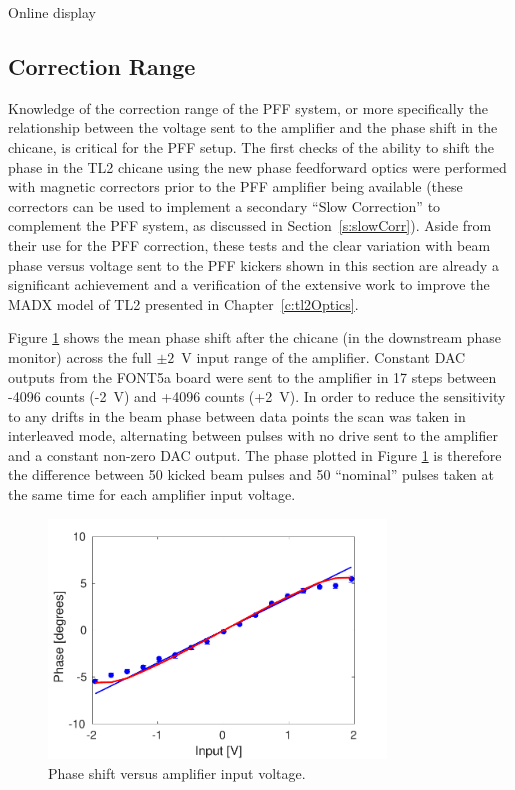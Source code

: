 Online display



\subsection{Correction Range}
\label{ss:corrRange}

Knowledge of the correction range of the PFF system, or more specifically the relationship between the voltage sent to the amplifier and the phase shift in the chicane, is critical for the PFF setup. The first checks of the ability to shift the phase in the TL2 chicane using the new phase feedforward optics were performed with magnetic correctors prior to the PFF amplifier being available (these correctors can be used to implement a secondary ``Slow Correction'' to complement the PFF system, as discussed in Section~\ref{s:slowCorr}). Aside from their use for the PFF correction, these tests and the clear variation with beam phase versus voltage sent to the PFF kickers shown in this section are already a significant achievement and a verification of the extensive work to improve the MADX model of TL2 presented in Chapter~\ref{c:tl2Optics}. 

Figure \ref{f:phaseVsAmpVoltage} shows the mean phase shift after the chicane (in the downstream phase monitor) across the full \(\pm2\)~V input range of the amplifier. Constant DAC outputs from the FONT5a board were sent to the amplifier in 17 steps between -4096 counts (-2~V) and +4096 counts (+2~V). In order to reduce the sensitivity to any drifts in the beam phase between data points the scan was taken in interleaved mode, alternating between pulses with no drive sent to the amplifier and a constant non-zero DAC output. The phase plotted in Figure \ref{f:phaseVsAmpVoltage} is therefore the difference between 50 kicked beam pulses and 50 ``nominal'' pulses taken at the same time for each amplifier input voltage. 

\begin{figure}
  \centering
  \includegraphics[width=0.8\textwidth]{Figures/commissioning/phaseVsAmpVoltage}
  \caption{Phase shift versus amplifier input voltage.}
  \label{f:phaseVsAmpVoltage}
\end{figure}

